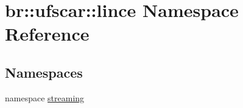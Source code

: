 \hypertarget{namespacebr_1_1ufscar_1_1lince}{
\section{br::ufscar::lince Namespace Reference}
\label{namespacebr_1_1ufscar_1_1lince}
}
\subsection*{Namespaces}
\begin{DoxyCompactItemize}
\item 
namespace \hyperlink{namespacebr_1_1ufscar_1_1lince_1_1streaming}{streaming}
\end{DoxyCompactItemize}
